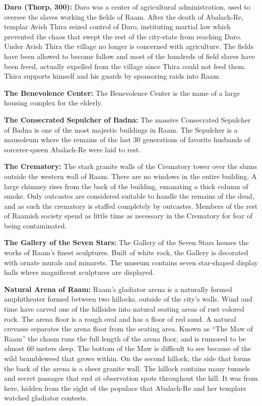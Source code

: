 {
	\textbf{Daro (Thorp, 300):} Daro was a center of agricultural administration, used to oversee the slaves working the fields of Raam. After the death of Abalach-Re, templar Avish Thira seized control of Daro, instituting martial law which prevented the chaos that swept the rest of the city-state from reaching Daro. Under Avish Thira the village no longer is concerned with agriculture. The fields have been allowed to become fallow and most of the hundreds of field slaves have been freed, actually expelled from the village since Thira could not feed them. Thira supports himself and his guards by sponsoring raids into Raam.
}
{
	\textbf{The Benevolence Center:} The Benevolence Center is the name of a large housing complex for the elderly.

	\textbf{The Consecrated Sepulcher of Badna:} The massive Consecrated Sepulcher of Badna is one of the most majestic buildings in Raam. The Sepulcher is a mausoleum where the remains of the last 30 generations of favorite husbands of sorcerer-queen Abalach-Re were laid to rest.

	\textbf{The Crematory:} The stark granite walls of the Crematory tower over the slums outside the western wall of Raam. There are no windows in the entire building. A large chimney rises from the back of the building, emanating a thick column of smoke. Only outcastes are considered suitable to handle the remains of the dead, and as such the crematory is staffed completely by outcastes. Members of the rest of Raamish society spend as little time as necessary in the Crematory for fear of being contaminated.

	\textbf{The Gallery of the Seven Stars:} The Gallery of the Seven Stars houses the works of Raam's finest sculptures. Built of white rock, the Gallery is decorated with ornate murals and minarets. The museum contains seven star-shaped display halls where magnificent sculptures are displayed.

	\textbf{Natural Arena of Raam:} Raam's gladiator arena is a naturally formed amphitheater formed between two hillocks, outside of the city's walls. Wind and time have carved one of the hillsides into natural seating areas of rust colored rock. The arena floor is a rough oval and has a floor of red sand. A natural crevasse separates the arena floor from the seating area. Known as ``The Maw of Raam'' the chasm runs the full length of the arena floor, and is rumored to be almost 60 meters deep. The bottom of the Maw is difficult to see because of the wild brambleweed that grows within. On the second hillock, the side that forms the back of the arena is a sheer granite wall. The hillock contains many tunnels and secret passages that end at observation spots throughout the hill. It was from here, hidden from the sight of the populace that Abalach-Re and her templars watched gladiator contests.

}
